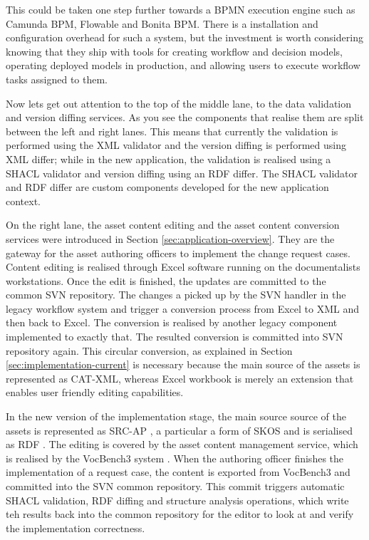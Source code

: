 	This could be taken one step further towards a BPMN \citep{bpmn-introduction} execution engine such as Camunda BPM, Flowable and Bonita BPM. There is a installation and configuration overhead for such a system, but the investment is worth considering knowing that they ship with tools for creating workflow and decision models, operating deployed models in production, and allowing users to execute workflow tasks assigned to them. 
	
	Now lets get out attention to the top of the middle lane, to the data validation and version diffing services. As you see the components that realise them are split between the left and right lanes. This means that currently the validation is performed using the XML validator and the version diffing is performed using XML differ; while in the new application, the validation is realised using a SHACL \citep{shacl-spec} validator and version diffing using an RDF differ. The SHACL validator and RDF differ are custom components developed for the new application context.
	
	On the right lane, the asset content editing and the asset content conversion services were introduced in Section \ref{sec:application-overview}. They are the gateway for the asset authoring officers to implement the change request cases. Content editing is realised through Excel software running on the documentalists workstations. Once the edit is finished, the updates are committed to the common SVN repository. The changes a picked up by the SVN handler in the legacy workflow system and trigger a conversion process from Excel to XML and then back to Excel. The conversion is realised by another legacy component implemented to exactly that. The resulted conversion is committed into SVN repository again. This circular conversion, as explained in Section \ref{sec:implementation-current} is necessary because the main source of the assets is represented as CAT-XML, whereas Excel workbook is merely an extension that enables user friendly editing capabilities.
	
	In the new version of the implementation stage, the main source source of the assets is represented as SRC-AP \cite{src-ap-vb3}, a particular a form of SKOS \citep{skos-spec} and is serialised as RDF \citep{rdf11}. The editing is covered by the asset content management service, which is realised by the VocBench3 system \citep{stellatovocbench}. When the authoring officer finishes the implementation of a request case, the content is exported from VocBench3 and committed into the SVN common repository. This commit triggers automatic SHACL validation, RDF diffing and structure analysis operations, which write teh results back into the common repository for the editor to look at and verify the implementation correctness. 
	
